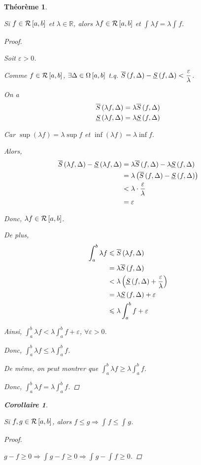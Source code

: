 \documentclass{report}
\newcommand*{\dint}[3]{\displaystyle\int_{#1}^{#2}#3}
\newcommand*{\eps}{\varepsilon}
\newcommand*{\lte}{\leqslant}
\newcommand*{\gte}{\geqslant}
\newcommand*{\reels}{\mathbb{R}}
\newtheorem*{thm}{Th\'eor\`eme}
\newtheorem*{coro}{Corollaire}
\theoremstyle{definition}
\theoremstyle{remark}
\begin{document}
	\begin{thm}
		~

		Si $f \in \riemann$ et $\lambda \in \reels$, alors $\lambda f \in \riemann$ et $\dint{}{}{\lambda f} = \lambda \dint{}{}{f}$.
		\begin{proof}~

			Soit $\eps>0$.
			
			Comme $f \in \riemann$, $\exists\Delta \in \partitions$ t.q. $\ssup{f} - \sinf{f} < \dfrac{\eps}{\lambda}$.
			
			On a
			\begin{align*}
				\ssup{\lambda f}&= \lambda \ssup{f}\\
				\sinf{\lambda f}&= \lambda \sinf{f}
			\end{align*}
			
			Car $\sup(\lambda f) = \lambda \sup f$ et $\inf(\lambda f) = \lambda \inf f$.
			
			Alors,
			\begin{align*}
				\ssup{\lambda f} - \sinf{\lambda f}&= \lambda \ssup{f} - \lambda \sinf{f}\\
				&= \lambda \left( \ssup{f} - \sinf{f} \right)\\
				&< \lambda \cdot \dfrac{\eps}{\lambda}\\
				&= \eps
			\end{align*}
			
			Donc, $\lambda f \in \riemann$.
			
			De plus,
			\begin{align*}
				\dint{a}{b}{\lambda f}&\lte \ssup{\lambda f}\\
				&= \lambda \ssup{f}\\
				&< \lambda \left( \sinf{f} + \dfrac{\eps}{\lambda} \right)\\
				&= \lambda \sinf{f} + \eps\\
				&\lte \lambda \dint{a}{b}{f} + \eps
			\end{align*}
			
			Ainsi, $\dint{a}{b}{\lambda f} < \lambda \dint{a}{b}{f} + \eps$, $\forall\eps>0$.
			
			Donc, $\dint{a}{b}{\lambda f} \lte \lambda \dint{a}{b}{f}$.
			
			De m\^eme, on peut montrer que $\dint{a}{b}{\lambda f} \gte \lambda \dint{a}{b}{f}$.
			
			Donc, $\dint{a}{b}{\lambda f} = \lambda \dint{a}{b}{f}$.
		\end{proof}
		\begin{coro}
			~

			Si $f,g \in \riemann$, alors $f \lte g \Rightarrow \dint{}{}{f} \lte \dint{}{}{g}$.
			\begin{proof}~

				$g-f \gte 0 \Rightarrow \dint{}{}{g-f} \gte 0 \Rightarrow \dint{}{}{g} - \dint{}{}{f} \gte 0$.
			\end{proof}
		\end{coro}
	\end{thm}
\end{document}

